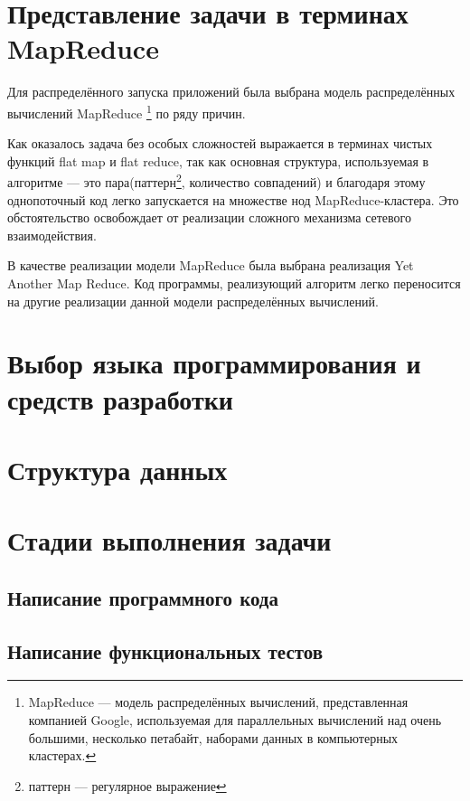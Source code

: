 \section{Представление задачи в терминах MapReduce}
Для распределённого запуска приложений была выбрана модель распределённых вычислений MapReduce \footnote{MapReduce — модель распределённых вычислений, представленная компанией Google, используемая для параллельных вычислений над очень большими, несколько петабайт, наборами данных в компьютерных кластерах.} по ряду причин.

Как оказалось задача без особых сложностей выражается в терминах чистых функций flat map и flat reduce, так как основная структура, используемая в алгоритме --- это пара(паттерн\footnote{паттерн --- регулярное выражение}, количество совпадений) и благодаря этому однопоточный код легко запускается на множестве нод MapReduce-кластера. Это обстоятельство освобождает от реализации сложного механизма сетевого взаимодействия.

В качестве реализации модели MapReduce была выбрана реализация Yet Another Map Reduce. Код программы, реализующий алгоритм легко переносится на другие реализации данной модели распределённых вычислений.


\section{Выбор языка программирования и средств разработки}
\section{Структура данных}
\section{Стадии выполнения задачи}
\subsection{Написание программного кода}
\subsection{Написание функциональных тестов}
